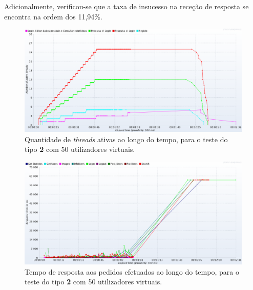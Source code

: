 Adicionalmente, verificou-se que a taxa de insucesso na receção de resposta se encontra na ordem dos 11,94\%. 


\begin{figure}[H]
    \centering
    \includegraphics[width=1\textwidth]{images/Testes/3PC_RU_50T.png}
    \caption{Quantidade de \textit{threads} ativas ao longo do tempo, para o teste do tipo \textbf{2} com 50 utilizadores virtuais.}
    \label{fig:3PC_RU_50_threads}
\end{figure}

\begin{figure}[H]
    \centering
    \includegraphics[width=1\textwidth]{images/Testes/3PC_RU_50R.png}
    \caption{Tempo de resposta aos pedidos efetuados ao longo do tempo, para o teste do tipo \textbf{2} com 50 utilizadores virtuais.}
    \label{fig:3PC__RU_50_response}
\end{figure}

